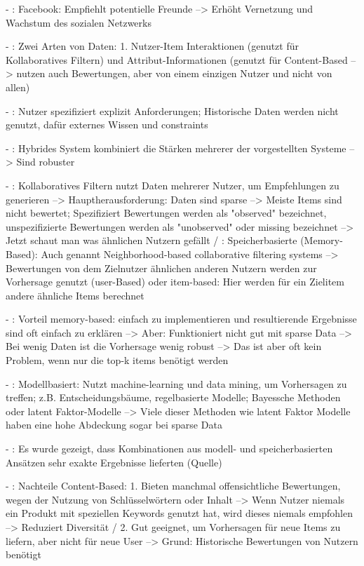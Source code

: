 - \cite[S. 7]{recommenderSystems:2016}: Facebook: Empfiehlt potentielle Freunde --> Erhöht Vernetzung und Wachstum des sozialen Netzwerks

- \cite[S. 8]{recommenderSystems:2016}: Zwei Arten von Daten: 1. Nutzer-Item Interaktionen (genutzt für Kollaboratives Filtern) und Attribut-Informationen (genutzt für Content-Based --> nutzen auch Bewertungen, aber von einem einzigen Nutzer und nicht von allen)

- \cite[S. 8]{recommenderSystems:2016}: Nutzer spezifiziert explizit Anforderungen; Historische Daten werden nicht genutzt, dafür externes Wissen und constraints 

- \cite[S. 8]{recommenderSystems:2016}: Hybrides System kombiniert die Stärken mehrerer der vorgestellten Systeme --> Sind robuster

- \cite[S. 8]{recommenderSystems:2016}: Kollaboratives Filtern nutzt Daten mehrerer Nutzer, um Empfehlungen zu generieren --> Hauptherausforderung: Daten sind sparse --> Meiste Items sind nicht bewertet; Spezifiziert Bewertungen werden als "observed" bezeichnet, unspezifizierte Bewertungen werden als "unobserved" oder missing bezeichnet --> Jetzt schaut man was ähnlichen Nutzern gefällt / \cite[S. 9]{recommenderSystems:2016}: Speicherbasierte (Memory-Based): Auch genannt Neighborhood-based collaborative filtering systems --> Bewertungen von dem Zielnutzer ähnlichen anderen Nutzern werden zur Vorhersage genutzt (user-Based) oder item-based: Hier werden für ein Zielitem andere ähnliche Items berechnet

- \cite[S. 9]{recommenderSystems:2016}: Vorteil memory-based: einfach zu implementieren und resultierende Ergebnisse sind oft einfach zu erklären --> Aber: Funktioniert nicht gut mit sparse Data --> Bei wenig Daten ist die Vorhersage wenig robust --> Das ist aber oft kein Problem, wenn nur die top-k items benötigt werden

- \cite[S. 9]{recommenderSystems:2016}: Modellbasiert: Nutzt machine-learning und data mining, um Vorhersagen zu treffen; z.B. Entscheidungsbäume, regelbasierte Modelle; Bayessche Methoden oder latent Faktor-Modelle --> Viele dieser Methoden wie latent Faktor Modelle haben eine hohe Abdeckung sogar bei sparse Data

- \cite[S. 10]{recommenderSystems:2016}: Es wurde gezeigt, dass Kombinationen aus modell- und speicherbasierten Ansätzen sehr exakte Ergebnisse lieferten (Quelle)

- \cite[S. 15]{recommenderSystems:2016}: Nachteile Content-Based: 1. Bieten manchmal offensichtliche Bewertungen, wegen der Nutzung von Schlüsselwörtern oder Inhalt --> Wenn Nutzer niemals ein Produkt mit speziellen Keywords genutzt hat, wird dieses niemals empfohlen --> Reduziert Diversität / 2. Gut geeignet, um Vorhersagen für neue Items zu liefern, aber nicht für neue User --> Grund: Historische Bewertungen von Nutzern benötigt 

